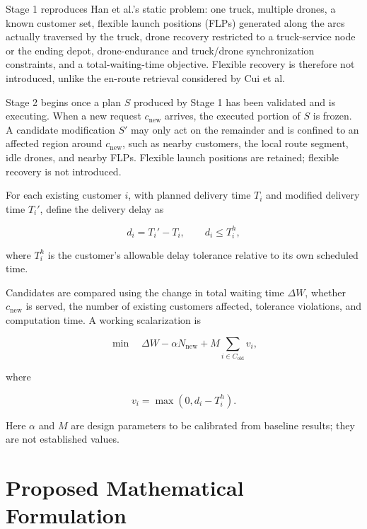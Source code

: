 \documentclass[10pt,a4paper]{article}
\begin{document}
Stage 1 reproduces Han et al.'s static problem: one truck, multiple
drones, a known customer set, flexible launch positions (FLPs) generated
along the arcs actually traversed by the truck, drone recovery
restricted to a truck-service node or the ending depot, drone-endurance
and truck/drone synchronization constraints, and a total-waiting-time
objective. Flexible recovery is therefore not introduced, unlike the
en-route retrieval considered by Cui et al.

Stage 2 begins once a plan $S$ produced by Stage 1 has been validated
and is executing. When a new request $c_{\mathrm{new}}$ arrives, the
executed portion of $S$ is frozen. A candidate modification $S'$ may
only act on the remainder and is confined to an affected region around
$c_{\mathrm{new}}$, such as nearby customers, the local route segment,
idle drones, and nearby FLPs. Flexible launch positions are retained;
flexible recovery is not introduced.

For each existing customer $i$, with planned delivery time $T_i$ and
modified delivery time $T_i'$, define the delivery delay as

\begin{equation}
d_i = T_i' - T_i,
\qquad
d_i \leq T_i^h ,
\label{eq:tolerance}
\end{equation}

where $T_i^h$ is the customer's allowable delay tolerance relative to
its own scheduled time.

Candidates are compared using the change in total waiting time
$\Delta W$, whether $c_{\mathrm{new}}$ is served, the number of
existing customers affected, tolerance violations, and computation
time. A working scalarization is

\begin{equation}
\min\quad
\Delta W-\alpha N_{\mathrm{new}}
+
M\sum_{i\in C_{\mathrm{old}}}v_i ,
\label{eq:objective}
\end{equation}

where

\begin{equation}
v_i=\max\left(0,d_i-T_i^h\right).
\label{eq:violation}
\end{equation}

Here $\alpha$ and $M$ are design parameters to be calibrated from
baseline results; they are not established values.

\section{Proposed Mathematical Formulation}
\end{document}
